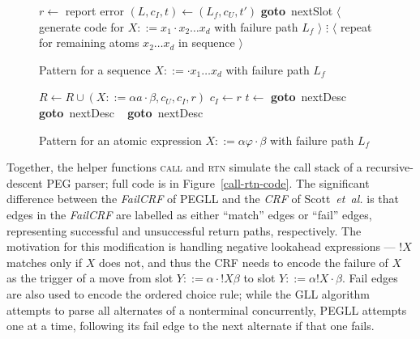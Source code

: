\documentclass{article}
\makeatletter
\newcommand{\nl}{\mathord{!}}
\newcommand{\Goto}[1]{\textbf{goto}~#1}
\newcommand{\etal}{\textit{et~al.}\@}
\makeatother
\begin{document}
\begin{figure}
\caption[Sequence expression code pattern]{Pattern for a sequence $X ::= \cdot x_1 \ldots x_d$ with failure path $L_f$} \label{seq-expr-pattern}
\begin{algorithmic}
\State $r \gets$ 
	\State report error
	\State $(L, c_I, t) \gets (L_f, c_U, t')$ \Goto{nextSlot}
\EndIf
\State $\langle$ generate code for $X ::= x_1 \cdot x_2 \ldots x_d$ with failure path $L_f$ $\rangle$
\State $\vdots$
\State $\langle$ repeat for remaining atoms $x_2 \ldots x_d$ in sequence $\rangle$
\end{algorithmic}
\end{figure}

\begin{figure}
\caption[Atomic expression code patterns]{Pattern for an atomic expression $X ::= \alpha \varphi \cdot \beta$ with failure path $L_f$} \label{atom-expr-pattern}
\begin{algorithmic}
	\State $R \gets R \cup (X ::= \alpha a \cdot \beta, c_U, c_I, r)$
	\State $c_I \gets r$
	\State $t \gets$ 
\EndStaticCase{}
	\State {} \Goto{nextDesc}
\State ~
	\State {} \Goto{nextDesc}
\State ~
\StaticCase{$\varphi = \nl Y$}
	\State \Call{call}{$L_f, X ::= \alpha ~\nl Y \cdot \beta$, $Y$, $c_U$, $c_I$} \Goto{nextDesc}
\EndStaticCase{\textbf{case} $X ::= \alpha ~\nl Y \cdot \beta$:}
\end{algorithmic}
\end{figure}

Together, the helper functions \textsc{call} and \textsc{rtn} simulate the call stack of a recursive-descent PEG parser; full code is in Figure~\ref{call-rtn-code}. 
The significant difference between the \emph{FailCRF} of PEGLL and the \emph{CRF} of Scott~\etal \cite{SJvB19} is that edges in the \emph{FailCRF} are labelled as either ``match'' edges or ``fail'' edges, representing successful and unsuccessful return paths, respectively. 
The motivation for this modification is handling negative lookahead expressions --- $\nl X$ matches only if $X$ does not, and thus the CRF needs to encode the failure of $X$ as the trigger of a move from slot $Y ::= \alpha \cdot \nl X \beta$ to slot $Y ::= \alpha \nl X \cdot \beta$. 
Fail edges are also used to encode the ordered choice rule; while the GLL algorithm attempts to parse all alternates of a nonterminal concurrently, PEGLL attempts one at a time, following its fail edge to the next alternate if that one fails. 
\end{document}
